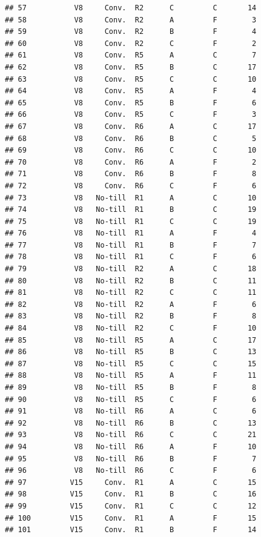 \documentclass[
]{article}
\begin{document}
\begin{verbatim}
## 57           V8     Conv.  R2      C         C       14
## 58           V8     Conv.  R2      A         F        3
## 59           V8     Conv.  R2      B         F        4
## 60           V8     Conv.  R2      C         F        2
## 61           V8     Conv.  R5      A         C        7
## 62           V8     Conv.  R5      B         C       17
## 63           V8     Conv.  R5      C         C       10
## 64           V8     Conv.  R5      A         F        4
## 65           V8     Conv.  R5      B         F        6
## 66           V8     Conv.  R5      C         F        3
## 67           V8     Conv.  R6      A         C       17
## 68           V8     Conv.  R6      B         C        5
## 69           V8     Conv.  R6      C         C       10
## 70           V8     Conv.  R6      A         F        2
## 71           V8     Conv.  R6      B         F        8
## 72           V8     Conv.  R6      C         F        6
## 73           V8   No-till  R1      A         C       10
## 74           V8   No-till  R1      B         C       19
## 75           V8   No-till  R1      C         C       19
## 76           V8   No-till  R1      A         F        4
## 77           V8   No-till  R1      B         F        7
## 78           V8   No-till  R1      C         F        6
## 79           V8   No-till  R2      A         C       18
## 80           V8   No-till  R2      B         C       11
## 81           V8   No-till  R2      C         C       11
## 82           V8   No-till  R2      A         F        6
## 83           V8   No-till  R2      B         F        8
## 84           V8   No-till  R2      C         F       10
## 85           V8   No-till  R5      A         C       17
## 86           V8   No-till  R5      B         C       13
## 87           V8   No-till  R5      C         C       15
## 88           V8   No-till  R5      A         F       11
## 89           V8   No-till  R5      B         F        8
## 90           V8   No-till  R5      C         F        6
## 91           V8   No-till  R6      A         C        6
## 92           V8   No-till  R6      B         C       13
## 93           V8   No-till  R6      C         C       21
## 94           V8   No-till  R6      A         F       10
## 95           V8   No-till  R6      B         F        7
## 96           V8   No-till  R6      C         F        6
## 97          V15     Conv.  R1      A         C       15
## 98          V15     Conv.  R1      B         C       16
## 99          V15     Conv.  R1      C         C       12
## 100         V15     Conv.  R1      A         F       15
## 101         V15     Conv.  R1      B         F       14

\end{verbatim}
\end{document}
